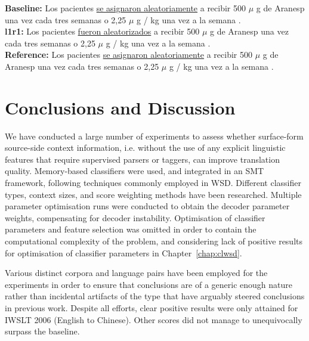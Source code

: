 \begin{exe}
\footnotesize
\ex \textbf{Baseline:} Los pacientes \underline{se asignaron aleatoriamente} a recibir 500 $\mu$ g de Aranesp una vez cada tres semanas o 2,25 $\mu$ g / kg una vez a la semana . \\
\textbf{l1r1:} Los pacientes \underline{fueron aleatorizados} a recibir 500 $\mu$ g de Aranesp una vez cada tres semanas o 2,25 $\mu$ g / kg una vez a la semana . \\
\textbf{Reference:} Los pacientes \underline{se asignaron aleatoriamente} a recibir 500 $\mu$ g de Aranesp una vez cada tres semanas o 2,25 $\mu$ g / kg una vez a la semana .
\label{ex:QAnegative}
\end{exe}


\section{Conclusions and Discussion} 
\label{sec:conclusion}

We have conducted a large number of experiments to assess whether surface-form
source-side context information, i.e. without the use of any explicit
linguistic features that require supervised parsers or taggers, can improve
translation quality. Memory-based classifiers were used, and integrated in an
SMT framework, following techniques commonly employed in WSD. Different
classifier types, context sizes, and score weighting methods have been
researched. Multiple parameter optimisation runs were conducted to obtain the
decoder parameter weights, compensating for decoder instability. Optimisation
of classifier parameters and feature selection was omitted in order to contain
the computational complexity of the problem, and considering lack of positive
results for optimisation of classifier parameters in Chapter~\ref{chap:clwsd}.

Various distinct corpora and language pairs have been employed for the
experiments in order to ensure that conclusions are of a generic enough
nature rather than incidental artifacts of the type that have arguably steered
conclusions in previous work. Despite all efforts, clear positive results were only
attained for IWSLT 2006 (English to Chinese). Other scores did not manage to
unequivocally surpass the baseline.


